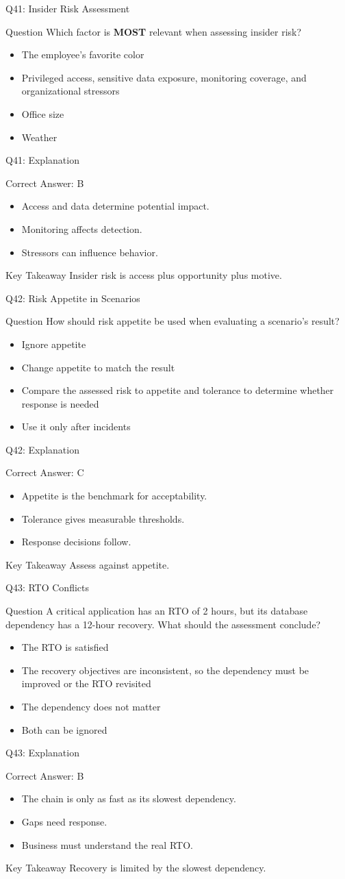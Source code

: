 \documentclass[aspectratio=169]{beamer}
\newcommand{\hq}[7]{%
	\begin{frame}{Q#1: #2}
		\begin{block}{Question}
			#3
		\end{block}
		\begin{itemize}
			#4
		\end{itemize}
	\end{frame}
	\begin{frame}{Q#1: Explanation}
		\begin{block}{Correct Answer: #5}
			\begin{itemize}
				#6
			\end{itemize}
		\end{block}
		\begin{alertblock}{Key Takeaway}
			#7
		\end{alertblock}
	\end{frame}
}
\begin{document}
	\hq{41}{Insider Risk Assessment}
	{Which factor is \textbf{MOST} relevant when assessing insider risk?}
	{\item[\textbf{(A)}] The employee's favorite color
		\item[\textbf{(B)}] Privileged access, sensitive data exposure, monitoring coverage, and organizational stressors
		\item[\textbf{(C)}] Office size
		\item[\textbf{(D)}] Weather}
	{B}
	{\item Access and data determine potential impact.
		\item Monitoring affects detection.
		\item Stressors can influence behavior.}
	{Insider risk is access plus opportunity plus motive.}

	\hq{42}{Risk Appetite in Scenarios}
	{How should risk appetite be used when evaluating a scenario's result?}
	{\item[\textbf{(A)}] Ignore appetite
		\item[\textbf{(B)}] Change appetite to match the result
		\item[\textbf{(C)}] Compare the assessed risk to appetite and tolerance to determine whether response is needed
		\item[\textbf{(D)}] Use it only after incidents}
	{C}
	{\item Appetite is the benchmark for acceptability.
		\item Tolerance gives measurable thresholds.
		\item Response decisions follow.}
	{Assess against appetite.}

	\hq{43}{RTO Conflicts}
	{A critical application has an RTO of 2 hours, but its database dependency has a 12-hour recovery. What should the assessment conclude?}
	{\item[\textbf{(A)}] The RTO is satisfied
		\item[\textbf{(B)}] The recovery objectives are inconsistent, so the dependency must be improved or the RTO revisited
		\item[\textbf{(C)}] The dependency does not matter
		\item[\textbf{(D)}] Both can be ignored}
	{B}
	{\item The chain is only as fast as its slowest dependency.
		\item Gaps need response.
		\item Business must understand the real RTO.}
	{Recovery is limited by the slowest dependency.}
\end{document}
